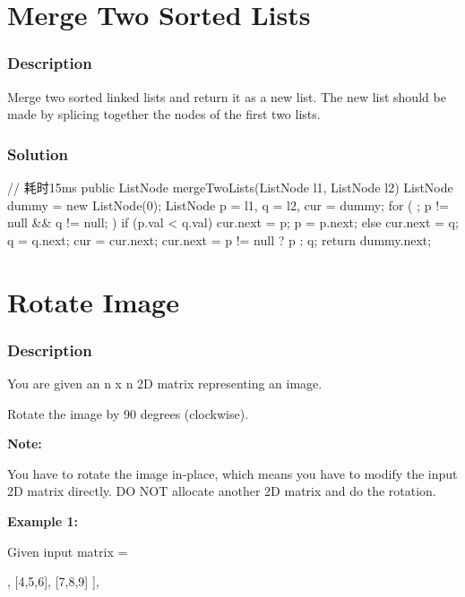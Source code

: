\newpage

\section{Merge Two Sorted Lists} %

\subsubsection{Description}
Merge two sorted linked lists and return it as a new list. The new list should be made by splicing together the nodes of the first two lists.

\subsubsection{Solution}

\begin{Code}
// 耗时15ms
public ListNode mergeTwoLists(ListNode l1, ListNode l2) {
    ListNode dummy = new ListNode(0);
    ListNode p = l1, q = l2, cur = dummy;
    for ( ; p != null && q != null; ) {
        if (p.val < q.val) {
            cur.next = p;
            p = p.next;
        } else {
            cur.next = q;
            q = q.next;
        }
        cur = cur.next;
    }
    cur.next = p != null ? p : q;
    return dummy.next;
}
\end{Code}

\newpage

\section{Rotate Image} %

\subsubsection{Description}
You are given an n x n 2D matrix representing an image.

Rotate the image by 90 degrees (clockwise).

\textbf{Note:}

You have to rotate the image in-place, which means you have to modify the input 2D matrix directly. DO NOT allocate another 2D matrix and do the rotation.

\textbf{Example 1:}

Given input matrix =
\begin{Code}
[
  [1,2,3],
  [4,5,6],
  [7,8,9]
],
\end{Code}

